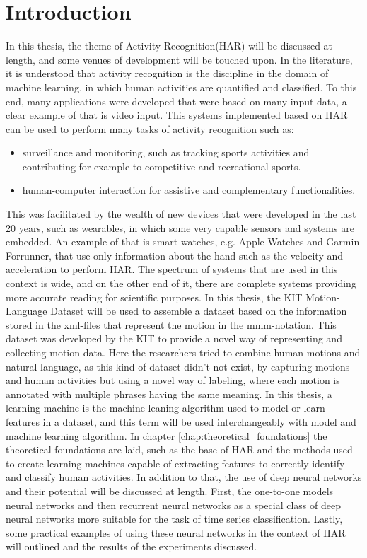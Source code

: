 \chapter{Introduction}
	In this thesis, the theme of Activity Recognition(HAR) will be discussed at length, and some venues of development will be touched upon. In the literature, it is understood that activity recognition is the discipline in the domain of machine learning, in which human activities are quantified and classified\cite{adeli2014multi}. To this end, many applications were developed that were based on many input data, a clear example of that is video input\cite{adeli2014multi}. This systems implemented based on HAR can be used to perform many tasks of activity recognition such as:
	\begin{itemize}
		\item surveillance and monitoring, such as tracking sports activities and contributing for example to competitive and recreational sports.
		\item human-computer interaction for assistive and complementary functionalities\cite{adeli2014multi}.
	\end{itemize}
	This was facilitated by the wealth of new devices that were developed in the last 20 years, such as wearables, in which some very capable sensors and systems are embedded. An example of that is smart watches, e.g. Apple Watches and Garmin Forrunner, that use only information about the hand such as the velocity and acceleration to perform HAR. The spectrum of systems that are used in this context is wide, and on the other end of it, there are complete systems providing more accurate reading for scientific purposes\cite{6365160}. In this thesis, the KIT Motion-Language Dataset will be used to assemble a dataset based on the information stored in the xml-files that represent the motion in the mmm-notation. This dataset was developed by the KIT to provide a novel way of representing and collecting motion-data. Here the researchers tried to combine human motions and natural language, as this kind of dataset didn't not exist\cite{Plappert2016}, by capturing motions and human activities but using a novel way of labeling, where each motion is annotated with multiple phrases having the same meaning.\newline
	In this thesis, a learning machine is the machine leaning algorithm used to model or learn features in a dataset, and this term will be used interchangeably with model and machine learning algorithm. In chapter \ref{chap:theoretical_foundations} the theoretical foundations are laid, such as the base of HAR and the methods used to create learning machines capable of extracting features to correctly identify and classify human activities. In addition to that, the use of deep neural networks and their potential will be discussed at length. First, the one-to-one models neural networks and then recurrent neural networks as a special class of deep neural networks more suitable for the task of time series classification. Lastly, some practical examples of using these neural networks in the context of HAR will outlined and the results of the experiments discussed.\newline
